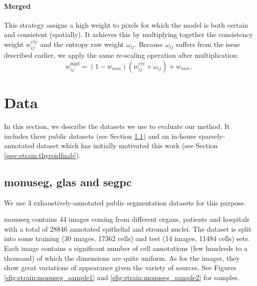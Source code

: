 
\paragraph{Merged} This strategy assigns a high weight to pixels for which the model is both certain and consistent (spatially). It achieves this by multiplying together the consistency weight $w^{\text{cty}}_{ij}$ and the entropy raw weight $\omega_{ij}$. Because $\omega_{ij}$ suffers from the issue described earlier, we apply the same re-scaling operation after multiplication:
\begin{equation}
w^{\text{mgd}}_{ij} = (1 - w_{min}) \left(w^{\text{cty}}_{ij} \times \omega_{ij}\right) + w_{min}.
\end{equation}


\section{Data}
\label{sec:strain:data}
In this section, we describe the datasets we use to evaluate our method. It includes three public datasets (see Section \ref{ssec:strain:datapublicdatasets}) and an in-house sparsely-annotated dataset which has initially motivated this work (see Section \ref{ssec:strain:thyroidfnab}). 

\subsection{\acrshort{monuseg}, \acrshort{glas} and \acrshort{segpc}}
\label{ssec:strain:datapublicdatasets}
We use 3 exhaustively-annotated public segmentation datasets for this purpose.

\acrshort{monuseg} \parencite{kumar2019multi} contains 44 images coming from different organs, patients and hospitals with a total of 28846 annotated epithelial and stromal nuclei. The dataset is split into some training (30 images, 17362 cells) and test (14 images, 11484 cells) sets. Each image contains a significant number of cell annotations (few hundreds to a thousand) of which the dimensions are quite uniform. As for the images, they show great variations of appearance given the variety of sources. See Figures \ref{sfig:strain:monuseg_sample1} and 
\ref{sfig:strain:monuseg_sample2} for samples.


